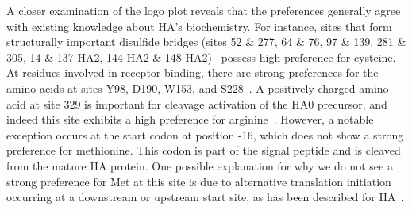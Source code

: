 \documentclass[9pt,twocolumn,twoside]{pnas-new}
\begin{document}
A closer examination of the logo plot reveals that the preferences generally agree with existing knowledge about HA's biochemistry.
For instance, sites that form structurally important disulfide bridges (sites 52 \& 277, 64 \& 76, 97 \& 139, 281 \& 305, 14 \& 137-HA2, 144-HA2 \& 148-HA2)~\cite{waterfield1981disulphide} possess high preference for cysteine.
At residues involved in receptor binding, there are strong preferences for the amino acids at sites Y98, D190, W153, and S228~\cite{weis1988structure,martin1998studies}.
A positively charged amino acid at site 329 is important for cleavage activation of the HA0 precursor, and indeed this site exhibits a high preference for arginine~\cite{kido1992isolation, stech2005new}.
However, a notable exception occurs at the start codon at position -16, which does not show a strong preference for methionine. 
This codon is part of the signal peptide and is cleaved from the mature HA protein.
One possible explanation for why we do not see a strong preference for Met at this site is due to alternative translation initiation occurring at a downstream or upstream start site, as has been described for HA~\cite{girard2011upstream}.
\end{document}
